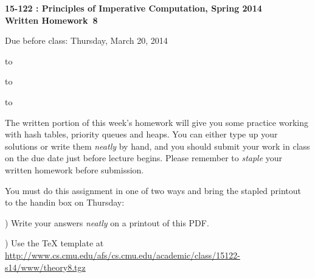 \documentclass[12pt]{exam}
\newcommand{\hwnumber}{8}
\newcommand{\semester}{Spring 2014}
\begin{document}
\addpoints
\begin{center}
\textbf{\large{15-122 : Principles of Imperative Computation, \semester
\\  \vspace{0.2in} Written Homework~\hwnumber
}}

 \vspace{0.2in}

 \large{Due before class: Thursday, March 20, 2014}
\end{center}

\vspace{0.5in}

\hbox to \textwidth{Name:\enspace\hrulefill}


\vspace{0.2in}

\hbox to \textwidth{Andrew ID:\enspace\hrulefill}

\vspace{0.2in}

\hbox to \textwidth{Recitation:\enspace\hrulefill}


\vspace{0.5in}

\noindent The written portion of this week's homework will give you some
practice working with hash tables, priority queues and heaps.
You can either type up your solutions or write them
\textit{neatly} by hand, and you should submit your work in class on the
due date just before lecture begins. Please remember to \textit{staple}
your written homework before submission.
\vspace{0.2in}

\begin{center}
\gradetable[v][questions]
\end{center}

\vspace{0.2in}
\begin{center}
  \Large{You must do this assignment in one of two ways and bring the stapled
         printout to the handin box on Thursday:

) Write your answers \textit{neatly} on a printout of this PDF.

) Use the TeX template at
    \url{http://www.cs.cmu.edu/afs/cs.cmu.edu/academic/class/15122-s14/www/theory8.tgz}
 }
\end{center}
\end{document}
